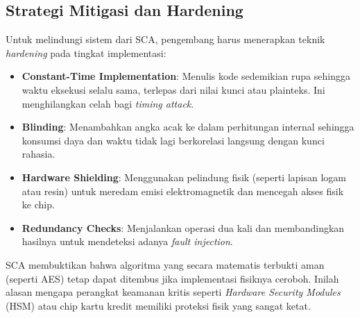\subsection{Strategi Mitigasi dan Hardening}

Untuk melindungi sistem dari SCA, pengembang harus menerapkan teknik \textit{hardening} pada tingkat implementasi:
\begin{itemize}
    \item \textbf{Constant-Time Implementation}: Menulis kode sedemikian rupa sehingga waktu eksekusi selalu sama, terlepas dari nilai kunci atau plainteks. Ini menghilangkan celah bagi \textit{timing attack}.
    \item \textbf{Blinding}: Menambahkan angka acak ke dalam perhitungan internal sehingga konsumsi daya dan waktu tidak lagi berkorelasi langsung dengan kunci rahasia.
    \item \textbf{Hardware Shielding}: Menggunakan pelindung fisik (seperti lapisan logam atau resin) untuk meredam emisi elektromagnetik dan mencegah akses fisik ke chip.
    \item \textbf{Redundancy Checks}: Menjalankan operasi dua kali dan membandingkan hasilnya untuk mendeteksi adanya \textit{fault injection}.
\end{itemize}

\begin{catatan}
SCA membuktikan bahwa algoritma yang secara matematis terbukti aman (seperti AES) tetap dapat ditembus jika implementasi fisiknya ceroboh. Inilah alasan mengapa perangkat keamanan kritis seperti \textit{Hardware Security Modules} (HSM) atau chip kartu kredit memiliki proteksi fisik yang sangat ketat.
\end{catatan}
